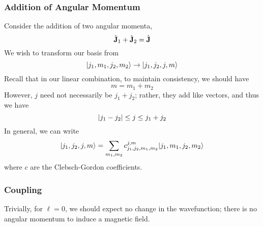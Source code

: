 \subsubsection{Addition of Angular Momentum}
Consider the addition of two angular momenta,
\[\hat{\mathbf{J}}_1+\hat{\mathbf{J}}_2 = \hat{\mathbf{J}}\]
We wish to transform our basis from
\[\lvert j_1,m_1,j_2,m_2\rangle\rightarrow \lvert j_1,j_2,j,m\rangle\]
Recall that in our linear combination, to maintain consistency, we should have 
\[m=m_1+m_2\]
However, \(j\) need not necessarily be \(j_1+j_2\); rather, they add like vectors, and thus we have
\[\left|j_1-j_2\right| \leq j \leq j_1+j_2\]
In general, we can write
\[\lvert j_1,j_2,j,m\rangle  = \sum_{m_1,m_2}c_{j_1,j_2,m_1,m_2}^{j,m}\lvert j_1,m_1,j_2,m_2\rangle\]
where \(c\) are the Clebsch-Gordon coefficients.

\break\subsubsection{Coupling}
Trivially, for \(\ell=0\), we should expect no change in the wavefunction; there is no angular momentum to induce a magnetic field. 

